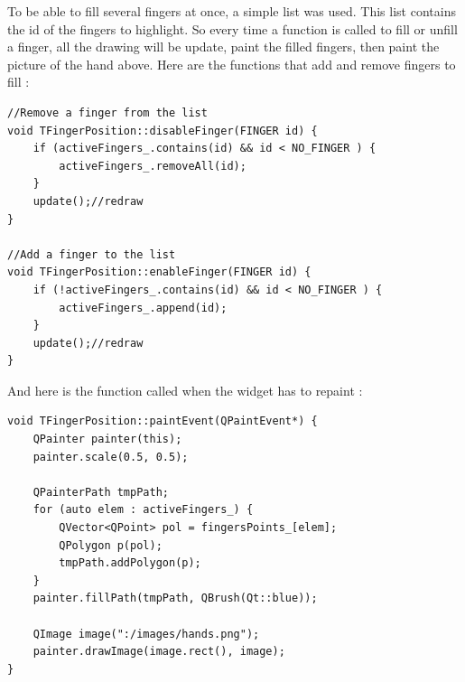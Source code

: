 To be able to fill several fingers at once, a simple list was used. This list contains the id of the fingers to highlight. So every time a function is called to fill or unfill a finger, all the drawing will be update, paint the filled fingers, then paint the picture of the hand above.
Here are the functions that add and remove fingers to fill :
\begin{lstlisting}
//Remove a finger from the list
void TFingerPosition::disableFinger(FINGER id) {
    if (activeFingers_.contains(id) && id < NO_FINGER ) {
        activeFingers_.removeAll(id);
    }
    update();//redraw
}

//Add a finger to the list
void TFingerPosition::enableFinger(FINGER id) {
    if (!activeFingers_.contains(id) && id < NO_FINGER ) {
        activeFingers_.append(id);
    }
    update();//redraw
}

\end{lstlisting}

And here is the function called when the widget has to repaint :
\begin{lstlisting}
void TFingerPosition::paintEvent(QPaintEvent*) {
    QPainter painter(this);
    painter.scale(0.5, 0.5);

    QPainterPath tmpPath;
    for (auto elem : activeFingers_) {
        QVector<QPoint> pol = fingersPoints_[elem];
        QPolygon p(pol);
        tmpPath.addPolygon(p);
    }
    painter.fillPath(tmpPath, QBrush(Qt::blue));

    QImage image(":/images/hands.png");
    painter.drawImage(image.rect(), image);
}
\end{lstlisting}

